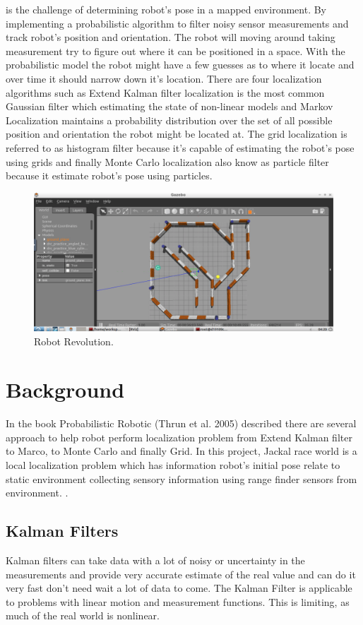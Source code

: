 \documentclass[10pt,journal,compsoc]{IEEEtran}
\begin{document}
 is the challenge of determining robot's pose in a mapped environment. By implementing a probabilistic algorithm to filter noisy sensor measurements
 and track robot's position and orientation. The robot will moving around taking measurement try to figure out where it can be positioned in a space. With the probabilistic model the robot might have a few guesses as to where it locate and over time it should narrow down it's location. There are four localization algorithms such as Extend Kalman filter localization is the most common Gaussian filter which estimating the state of non-linear models and Markov Localization maintains a probability distribution over the set of all possible position and orientation the robot might be located at. The grid localization is referred to as histogram filter because it's capable of estimating the robot's pose using grids and finally Monte Carlo localization also know as particle filter because it estimate robot's pose using particles.
\begin{figure}[thpb]
      \centering
      \includegraphics[width=\linewidth]{MapRobot.png}
      \caption{Robot Revolution.}
      \label{fig:robot1}
\end{figure}

\section{Background}
In the book Probabilistic Robotic (Thrun et al. 2005) described there are several approach to help robot perform localization problem from Extend Kalman filter to Marco, to Monte Carlo and finally Grid. In this project, Jackal race world is a local localization problem which has information robot's initial pose relate to static environment collecting sensory information using range finder sensors from environment.
.\cite{lamport1994latex}

\subsection{Kalman Filters}
 Kalman filters can take data with a lot of noisy or uncertainty in the measurements and provide very accurate estimate of the real value and can do it very fast don't need wait a lot of data to come. The Kalman Filter is applicable to problems with linear motion and measurement functions. This is limiting, as much of the real world is nonlinear.
 
\end{document}
